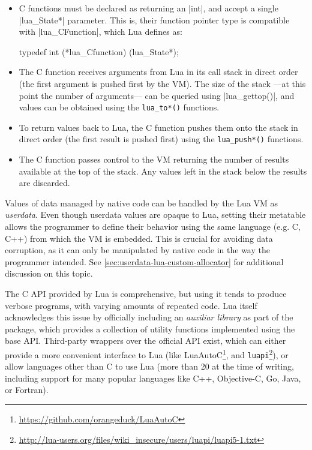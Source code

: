 \begin{itemize}
	\item C functions must be declared as returning an \Mc|int|, and accept
		a single \Mc|lua_State*| parameter. This is, their function pointer
		type is compatible with \Mc|lua_CFunction|, which Lua defines as:
		\begin{ccode}
			typedef int (*lua_Cfunction) (lua_State*);
		\end{ccode}

	\item The C function receives arguments from Lua in its call stack in
		direct order (the first argument is pushed first by the VM). The size of
		the stack —at this point the number of arguments— can be queried using
		\Mc|lua_gettop()|, and values can be obtained using the \verb|lua_to*()|
		functions.

	\item To return values back to Lua, the C function pushes them onto the
		stack in direct order (the first result is pushed first) using the
		\verb|lua_push*()| functions.

	\item The C function passes control to the VM returning the number of
		results available at the top of the stack. Any values left in the
		stack below the results are discarded.

\end{itemize}

Values of data managed by native code can be handled by the Lua VM as
\emph{userdata}. Even though userdata values are opaque to Lua, setting their
metatable allows the programmer to define their behavior using the same
language (e.g. C, C++) from which the VM is embedded. This is crucial for
avoiding data corruption, as it can only be manipulated by native code in
the way the programmer intended. See
\autoref{sec:userdata-lua-custom-allocator} for additional discussion
on this topic.

The C API provided by Lua is comprehensive, but using it tends to produce
verbose programs, with varying amounts of repeated code. Lua itself
acknowledges this issue by officially including an \emph{auxiliar library}
as part of the package, which provides a collection of utility functions
implemented using the base API. Third-party wrappers over the official API
exist, which can either provide a more convenient interface to Lua (like
LuaAutoC\footnote{\url{https://github.com/orangeduck/LuaAutoC}}, and
\verb|luapi|\footnote{\url{http://lua-users.org/files/wiki_insecure/users/luapi/luapi5-1.txt}}),
or allow languages other than C to use Lua (more than
20 at the time of writing, including support for many popular languages like
C++, Objective-C, Go, Java, or Fortran).


